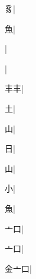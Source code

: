 \begin{multicols}{2}
{{\cjk{}{\cnsym{}　}{\cnsym{}　}豸}|{}\par
{\cjk{}{\cnsym{}　}{\cnsym{}　}魚}|{}\par
{}|{}\par
{\cjk{}{\cnsym{}　}{\cnsym{}　}{\cnsym{}　}}|{}\par
{\cjk{}{\cnsym{}　}丰丰}|{}\par
{\cjk{}{\cnsym{}　}{\cnsym{}　}土}|{}\par
{\cjk{}{\cnsym{}　}{\cnsym{}　}山}|{}\par
{\cjk{}{\cnsym{}　}{\cnsym{}　}日}|{}\par
{山}|{}\par
{\cjk{}{\cnsym{}　}{\cnsym{}　}小}|{}\par
{\cjk{}{\cnsym{}　}{\cnsym{}　}魚}|{}\par
{\cjk{}{\cnsym{}　}亠口}|{}\par
{亠口}|{}\par
{\cjk{}金亠口}|{}\par
}
\end{multicols}
